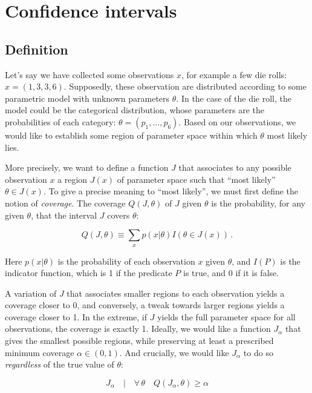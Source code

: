 \documentclass[11pt]{article}
\begin{document}
\section{Confidence intervals} 

\subsection{Definition}

Let's say we have collected some observations $x$, for example a few die rolls:
$x = (1, 3, 3, 6)$. Supposedly, these observation are distributed according to
some parametric model with unknown parameters $\theta$. In the case of the die
roll, the model could be the categorical distribution, whose parameters are the
probabilities of each category: $\theta = (p_1, \ldots, p_6)$. Based on our
observations, we would like to establish some region of parameter space within
which $\theta$ most likely lies.

More precisely, we want to define a function $J$ that associates to any
possible observation $x$ a region $J(x)$ of parameter space such that ``most
likely'' $\theta \in J(x)$. To give a precise meaning to ``most likely'', we
must first define the notion of \emph{coverage}. The coverage $Q(J, \theta)$ of
$J$ given $\theta$ is the probability, for any given $\theta$, that the
interval $J$ covers $\theta$:

\begin{equation}
    Q(J, \theta) \equiv \sum_{x} p(x|\theta) I(\theta \in J(x))\,.
\end{equation}

Here $p(x|\theta)$ is the probability of each observation $x$ given $\theta$,
and $I(P)$ is the indicator function, which is 1 if the predicate $P$ is true,
and 0 if it is false.

A variation of $J$ that associates smaller regions to each observation yields a
coverage closer to 0, and conversely, a tweak towards larger regions yields a
coverage closer to 1. In the extreme, if $J$ yields the full parameter space
for all observations, the coverage is exactly 1. Ideally, we would like a
function $J_\alpha$ that gives the smallest possible regions, while preserving
at least a  prescribed minimum coverage $\alpha \in(0, 1)$. And crucially, we
would like $J_\alpha$ to do so \emph{regardless} of the true value of $\theta$:

\begin{equation}
    J_\alpha\quad |\quad \forall\, \theta \quad Q(J_\alpha, \theta) \geq \alpha
\end{equation}
\end{document}
